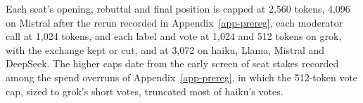 Each seat's opening, rebuttal and final position is capped at 2,560 tokens,
4,096 on Mistral after the rerun recorded in Appendix~\ref{app-prereg}, each
moderator call at 1,024 tokens, and each label and vote at 1,024 and 512
tokens on grok, with the exchange kept or cut, and at 3,072 on haiku, Llama,
Mistral and DeepSeek. The higher caps date from the early screen of seat
stakes recorded among the spend overruns of Appendix~\ref{app-prereg}, in
which the 512-token vote cap, sized to grok's short votes, truncated most of
haiku's votes.
